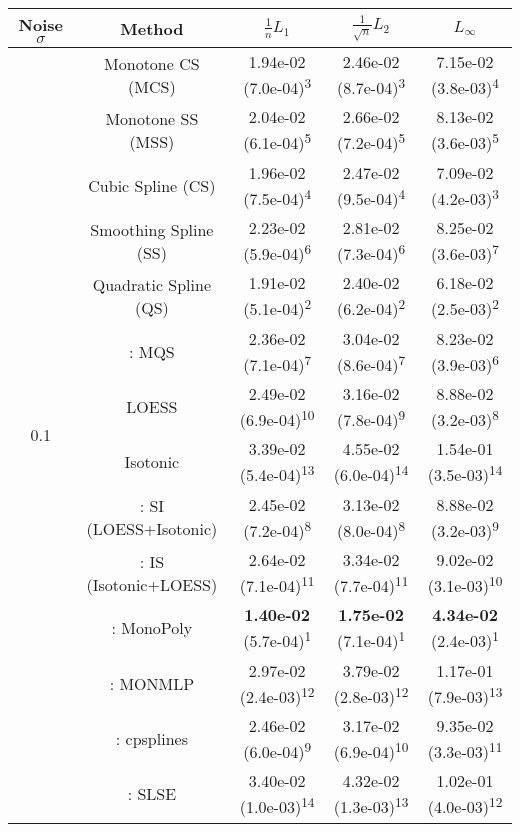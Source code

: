 \begin{tabular}{ccccc}
\toprule
Noise $\sigma$ & Method&$\frac 1n L_1$&$\frac{1}{\sqrt n}L_2$&$L_\infty$\tabularnewline
\midrule
\multirow{14}{*}{0.1}&Monotone CS (MCS)& 1.94e-02 (7.0e-04)\textsuperscript{3}& 2.46e-02 (8.7e-04)\textsuperscript{3}& 7.15e-02 (3.8e-03)\textsuperscript{4}\tabularnewline
&Monotone SS (MSS)& 2.04e-02 (6.1e-04)\textsuperscript{5}& 2.66e-02 (7.2e-04)\textsuperscript{5}& 8.13e-02 (3.6e-03)\textsuperscript{5}\tabularnewline
&Cubic Spline (CS)& 1.96e-02 (7.5e-04)\textsuperscript{4}& 2.47e-02 (9.5e-04)\textsuperscript{4}& 7.09e-02 (4.2e-03)\textsuperscript{3}\tabularnewline
&Smoothing Spline (SS)& 2.23e-02 (5.9e-04)\textsuperscript{6}& 2.81e-02 (7.3e-04)\textsuperscript{6}& 8.25e-02 (3.6e-03)\textsuperscript{7}\tabularnewline
&Quadratic Spline (QS)& 1.91e-02 (5.1e-04)\textsuperscript{2}& 2.40e-02 (6.2e-04)\textsuperscript{2}& 6.18e-02 (2.5e-03)\textsuperscript{2}\tabularnewline
&\textcite{heMonotoneBsplineSmoothing1998}: MQS& 2.36e-02 (7.1e-04)\textsuperscript{7}& 3.04e-02 (8.6e-04)\textsuperscript{7}& 8.23e-02 (3.9e-03)\textsuperscript{6}\tabularnewline
&LOESS& 2.49e-02 (6.9e-04)\textsuperscript{10}& 3.16e-02 (7.8e-04)\textsuperscript{9}& 8.88e-02 (3.2e-03)\textsuperscript{8}\tabularnewline
&Isotonic& 3.39e-02 (5.4e-04)\textsuperscript{13}& 4.55e-02 (6.0e-04)\textsuperscript{14}& 1.54e-01 (3.5e-03)\textsuperscript{14}\tabularnewline
&\textcite{mammenEstimatingSmoothMonotone1991}: SI (LOESS+Isotonic)& 2.45e-02 (7.2e-04)\textsuperscript{8}& 3.13e-02 (8.0e-04)\textsuperscript{8}& 8.88e-02 (3.2e-03)\textsuperscript{9}\tabularnewline
&\textcite{mammenEstimatingSmoothMonotone1991}: IS (Isotonic+LOESS)& 2.64e-02 (7.1e-04)\textsuperscript{11}& 3.34e-02 (7.7e-04)\textsuperscript{11}& 9.02e-02 (3.1e-03)\textsuperscript{10}\tabularnewline
&\textcite{murrayFastFlexibleMethods2016}: MonoPoly& \textbf{1.40e-02} (5.7e-04)\textsuperscript{1}& \textbf{1.75e-02} (7.1e-04)\textsuperscript{1}& \textbf{4.34e-02} (2.4e-03)\textsuperscript{1}\tabularnewline
&\textcite{cannonMonmlpMultilayerPerceptron2017}: MONMLP& 2.97e-02 (2.4e-03)\textsuperscript{12}& 3.79e-02 (2.8e-03)\textsuperscript{12}& 1.17e-01 (7.9e-03)\textsuperscript{13}\tabularnewline
&\textcite{navarro-garciaConstrainedSmoothingOutofrange2023}: cpsplines& 2.46e-02 (6.0e-04)\textsuperscript{9}& 3.17e-02 (6.9e-04)\textsuperscript{10}& 9.35e-02 (3.3e-03)\textsuperscript{11}\tabularnewline
&\textcite{groeneboomConfidenceIntervalsMonotone2023}: SLSE& 3.40e-02 (1.0e-03)\textsuperscript{14}& 4.32e-02 (1.3e-03)\textsuperscript{13}& 1.02e-01 (4.0e-03)\textsuperscript{12}\tabularnewline

\end{tabular}
